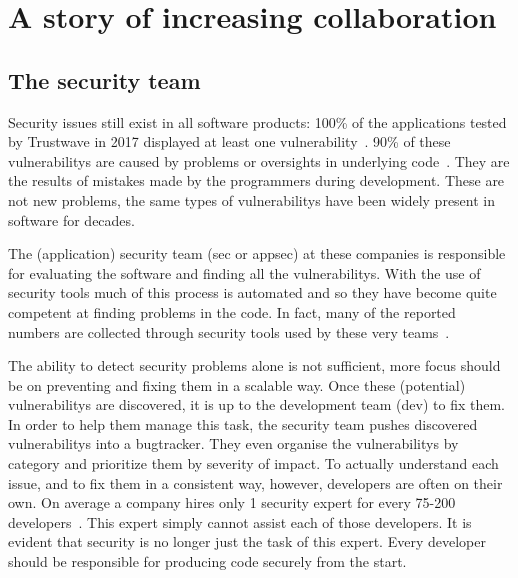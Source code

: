 
\section{A story of increasing collaboration}
\subsection{The security team}
Security issues still exist in all software products: 100\% of the applications tested by Trustwave in 2017 displayed at least one \gls{vulnerability}~\cite{trustwave}. 90\% of these \glspl{vulnerability} are caused by problems or oversights in underlying code~\cite{softwareassurance}. They are the results of mistakes made by the programmers during development. These are not new problems, the same types of \glspl{vulnerability} have been widely present in software for decades.

The (application) security team (\Gls{sec} or \Gls{appsec}) at these companies is responsible for evaluating the software and finding all the \glspl{vulnerability}. With the use of security tools much of this process is automated and so they have become quite competent at finding problems in the code. In fact, many of the reported numbers are collected through security tools used by these very teams~\cite{owasptop10data}. 

The ability to detect \glspl{security problem} alone is not sufficient, more focus should be on preventing and fixing them in a scalable way.
Once these (potential) \glspl{vulnerability} are discovered, it is up to the development team (\Gls{dev}) to fix them. 
In order to help them manage this task, the security team pushes discovered \glspl{vulnerability} into a \gls{bugtracker}. They even organise the \glspl{vulnerability} by category and prioritize them by severity of impact. To actually understand each \gls{issue}, and to fix them in a consistent way, however, developers are often on their own.
On average a company hires only 1 security expert for every 75-200 developers~\cite{bsimm9, bsimm11, shiftleftsurvey}. This expert simply cannot assist each of those developers. 
It is evident that security is no longer just the task of this expert. Every developer should be responsible for producing code securely from the start. 

